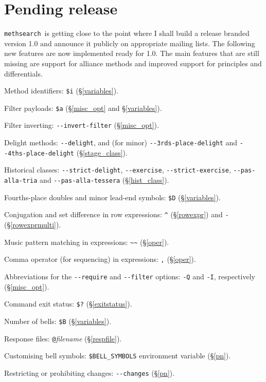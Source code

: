 \documentclass[a4paper,11pt,oneside]{book}
\def\methsearch{\texttt{meth\-search}}
\newcommand{\sref}[1]{\hyperref[#1]{\S\ref{#1}}}
\begin{document}
\section{Pending release}

\methsearch\ is getting close to the point where I shall build a release
branded version 1.0 and announce it publicly on appropriate mailing lists.
The following new features are now implemented ready for 1.0.  The main 
features that are still missing are support for alliance methods%
 and improved support for 
principles and differentials.

\begin{list}{}{\leftmargin=1em\itemsep=0em}
\item Method identifiers: \verb+$i+ (\sref{variables}).
\item Filter payloads: \verb+$a+ (\sref{misc_opt} and \sref{variables}). 
\item Filter inverting: \verb+--invert-filter+ (\sref{misc_opt}).
\item Delight methods: \verb+--delight+, and (for minor)
\verb+--3rds-place-delight+ and \verb+--4ths-place-delight+ 
(\sref{stage_class}).
\item Historical classes: \verb+--strict-delight+, \verb+--exercise+, 
\verb+--strict-exercise+, \verb+--pas-alla-tria+ and \verb+--pas-alla-tessera+
(\sref{hist_class}).
\item Fourths-place doubles and minor lead-end symbols:
  \verb+$D+ (\sref{variables}).
\item Conjugation and set difference in row expressions: 
  \verb+^+ (\sref{rowexpr}) and \verb+-+ (\sref{rowexprmulti}).
\item Music pattern matching in expressions: \verb+~~+ (\sref{oper}).
\item Comma operator (for sequencing) in expressions: \verb+,+ (\sref{oper}).
\item Abbreviations for the \verb+--require+ and \verb+--filter+ options:
  \verb+-Q+ and \verb+-I+, respectively (\sref{misc_opt}). 
\item Command exit status: \verb+$?+ (\sref{exitstatus}).
\item Number of bells: \verb+$B+ (\sref{variables}).
\item Response files: \verb+@+\textit{filename} (\sref{respfile}).
\item Customising bell symbols: \verb+$BELL_SYMBOLS+ environment variable 
  (\sref{pn}).
\item Restricting or prohibiting changes: \verb+--changes+ (\sref{pn}).

\end{list}
\end{document}
